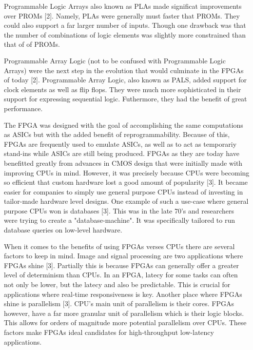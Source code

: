 \documentclass{article}
\begin{document}
    Programmable Logic Arrays also known as PLAs made significat improvements over PROMs [2].
    Namely, PLAs were generally must faster that PROMs. They could also support a far
    larger number of inputs. Though one drawback was that the number of combinations of
    logic elements was slightly more constrained than that of of PROMs.

    Programmable Array Logic (not to be confused with Programmable Logic Arrays) were the next
    step in the evolution that would culminate in the FPGAs of today [2]. Programmable Array Logic,
    also known as PALS, added support for clock elements as well as flip flops. They
    were much more sophisticated in their support for expressing sequential logic. Futhermore,
    they had the benefit of great performance.

    The FPGA was designed with the goal of accomplishing the same computations as ASICs but
    with the added benefit of reprogrammability. Because of this, FPGAs are frequently
    used to emulate ASICs, as well as to act as temporariy stand-ins while ASICs
    are still being produced. FPGAs as they are today have benefitted greatly
    from advances in CMOS design that were initially made with improving CPUs in mind.
    However, it was precisely because CPUs were becoming so efficient that custom hardware
    lost a good amount of popularity [3]. It became easier for companies to simply use
    general purpose CPUs instead of investing in tailor-made hardware level designs.
    One example of such a use-case where general purpose CPUs won is databases [3].
    This was in the late 70's and researchers were trying to create a "database-machine".
    It was specifically tailored to run database queries on low-level hardware.

    When it comes to the benefits of using FPGAs verses CPUs there are several factors to keep in mind.
    Image and signal processing are two applications where FPGAs shine [3].
    Partially this is because FPGAs can generally offer a greater level of determinism
    than CPUs. In an FPGA, latecy for some tasks can often not only be lower, but the latecy
    and also be predictable. This is crucial for applications where real-time
    responsiveness is key. Another place where FPGAs shine is parallelism [3].
    CPU's main unit of parallelism is their cores. FPGAs however, have a far more granular
    unit of parallelism which is their logic blocks. This allows for orders of magnitude
    more potential parallelism over CPUs. These factors make FPGAs ideal candidates
    for high-throughput low-latency applications.
\end{document}
